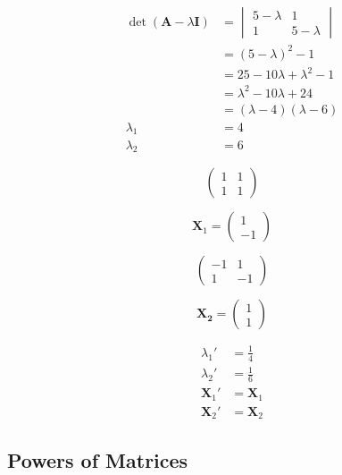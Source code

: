 \documentclass{article}
\begin{document}
\begin{align*}
  \det (\mathbf{A} - \lambda \mathbf{I}) & = \begin{vmatrix}
                                               5 - \lambda & 1           \\
                                               1           & 5 - \lambda
                                             \end{vmatrix}       \\
                                         & = (5 - \lambda)^2 - 1             \\
                                         & = 25 - 10 \lambda + \lambda^2 - 1 \\
                                         & = \lambda^2 - 10 \lambda + 24     \\
                                         & = (\lambda - 4) (\lambda - 6)     \\
  \lambda_1                              & = 4                               \\
  \lambda_2                              & = 6
\end{align*}

\[\begin{pmatrix}
    1 & 1 \\
    1 & 1
  \end{pmatrix}\]

\[\mathbf{X}_1 = \begin{pmatrix}
    1 \\
    -1
  \end{pmatrix}\]

\[\begin{pmatrix}
    -1 & 1  \\
    1  & -1
  \end{pmatrix}\]

\[\mathbf{X_2} = \begin{pmatrix}
    1 \\
    1
  \end{pmatrix}\]

\begin{align*}
  \lambda_1'    & = \frac{1}{4}  \\
  \lambda_2'    & = \frac{1}{6}  \\
  \mathbf{X}_1' & = \mathbf{X}_1 \\
  \mathbf{X}_2' & = \mathbf{X}_2
\end{align*}

\subsection{Powers of Matrices}
\end{document}
